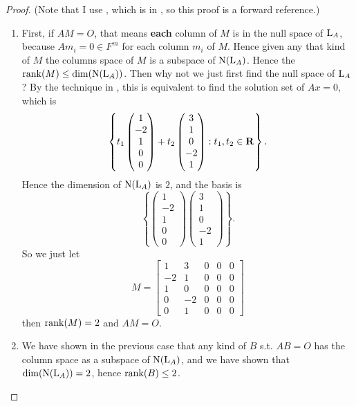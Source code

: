 \begin{proof}
(Note that I use , which is in , so this proof is a forward reference.)
\begin{enumerate}
\item
First, if \(AM = O\), that means \textbf{each} column of \(M\) is in the null space of \(\mathrm{L}_A\), because \(A m_i = 0 \in F^m\) for each column \(m_i\) of \(M\).
Hence given any that kind of \(M\) the columns space of \(M\) is a subspace of \(\mathrm{N}(\mathrm{L}_A)\).
Hence the \(\mathrm{rank}(M) \le \dim(\mathrm{N}(\mathrm{L}_A))\).
Then why not we just first find the null space of \(\mathrm{L}_A\)?
By the technique in , this is equivalent to find the solution set of \(Ax = 0\),
which is
\[
    \left\{
        t_1 \begin{pmatrix} 1 \\ -2 \\ 1 \\ 0 \\ 0 \end{pmatrix}
        + t_2 \begin{pmatrix} 3 \\ 1 \\ 0 \\ -2 \\ 1 \end{pmatrix}
        : t_1, t_2 \in \mathbf{R}
    \right\}.
\]
Hence the dimension of \(\mathrm{N}(\mathrm{L}_A)\) is \(2\), and the basis is
\[
    \left\{
        \begin{pmatrix} 1 \\ -2 \\ 1 \\ 0 \\ 0 \end{pmatrix}
        \begin{pmatrix} 3 \\ 1 \\ 0 \\ -2 \\ 1 \end{pmatrix}
    \right\}.
\]
So we just let
\[
    M = \left[\begin{array}{ccccc}
        1 & 3 & 0 & 0 & 0 \\
        -2 & 1 & 0 & 0 & 0 \\
        1 & 0 & 0 & 0 & 0 \\
        0 & -2 & 0 & 0 & 0 \\
        0 & 1 & 0 & 0 & 0
    \end{array}\right]
\]
then \(\mathrm{rank}(M) = 2\) and \(AM = O\).

\item We have shown in the previous case that any kind of \(B\) s.t. \(AB = O\) has the column space as a subspace of \(\mathrm{N}(\mathrm{L}_A)\), and we have shown that \(\dim(\mathrm{N}(\mathrm{L}_A)) = 2\), hence \(\mathrm{rank}(B) \le 2\).
\end{enumerate}
\end{proof}


